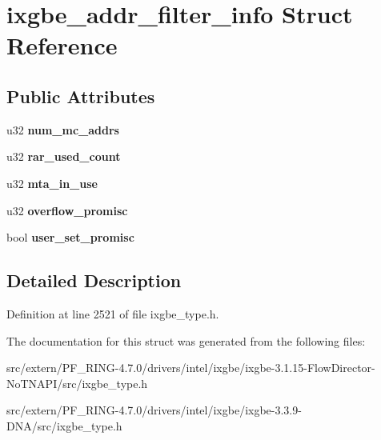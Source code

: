 \hypertarget{structixgbe__addr__filter__info}{
\section{ixgbe\_\-addr\_\-filter\_\-info Struct Reference}
\label{structixgbe__addr__filter__info}
}
\subsection*{Public Attributes}
\begin{DoxyCompactItemize}
\item 
\hypertarget{structixgbe__addr__filter__info_ae5c5752fffa427ce80b0de794750b549}{
u32 {\bfseries num\_\-mc\_\-addrs}}
\label{structixgbe__addr__filter__info_ae5c5752fffa427ce80b0de794750b549}

\item 
\hypertarget{structixgbe__addr__filter__info_ab7807bd77f66f0a46cd18977f73cbefe}{
u32 {\bfseries rar\_\-used\_\-count}}
\label{structixgbe__addr__filter__info_ab7807bd77f66f0a46cd18977f73cbefe}

\item 
\hypertarget{structixgbe__addr__filter__info_af52a87651dd3b996457f99279ea5a330}{
u32 {\bfseries mta\_\-in\_\-use}}
\label{structixgbe__addr__filter__info_af52a87651dd3b996457f99279ea5a330}

\item 
\hypertarget{structixgbe__addr__filter__info_addb991a48b64cdc1663b94d84213b563}{
u32 {\bfseries overflow\_\-promisc}}
\label{structixgbe__addr__filter__info_addb991a48b64cdc1663b94d84213b563}

\item 
\hypertarget{structixgbe__addr__filter__info_accb2222a1e245ebdc9400a674e02aeaf}{
bool {\bfseries user\_\-set\_\-promisc}}
\label{structixgbe__addr__filter__info_accb2222a1e245ebdc9400a674e02aeaf}

\end{DoxyCompactItemize}


\subsection{Detailed Description}


Definition at line 2521 of file ixgbe\_\-type.h.



The documentation for this struct was generated from the following files:\begin{DoxyCompactItemize}
\item 
src/extern/PF\_\-RING-\/4.7.0/drivers/intel/ixgbe/ixgbe-\/3.1.15-\/FlowDirector-\/NoTNAPI/src/ixgbe\_\-type.h\item 
src/extern/PF\_\-RING-\/4.7.0/drivers/intel/ixgbe/ixgbe-\/3.3.9-\/DNA/src/ixgbe\_\-type.h\end{DoxyCompactItemize}
